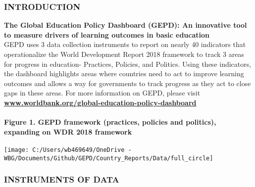 \documentclass[twocolumn]{article}
\author{}
\date{\vspace{-2.5em}}
\let\oldparagraph\paragraph
\renewcommand{\paragraph}[1]{\oldparagraph{#1}\mbox{}}
\begin{document}
\newcommand{\greynote}[1]{
    {\scriptsize
    \textcolor{darkgray}{\textit{Source:} #1}
  }
}

\newcommand{\greysource}[1]{
    {\scriptsize
    \textcolor{darkgray}{\textit{Source:} #1}
  }
}

\newcommand{\greydisclaimer}[1]{
    {\scriptsize
    \textcolor{darkgray}{\textit{Disclaimer:} #1}
  }
}

\newcommand*{\tabindent}{\hspace{1mm}}

\hypertarget{introduction}{%
\subsubsection{\texorpdfstring{\textbf{INTRODUCTION}}{INTRODUCTION}}\label{introduction}}

\textbf{The Global Education Policy Dashboard (GEPD): An innovative tool
to measure drivers of learning outcomes in basic education}\\
GEPD uses 3 data collection instruments to report on nearly 40
indicators that operationalize the World Development Report 2018
framework to track 3 areas for progress in education- Practices,
Policies, and Politics. Using these indicators, the dashboard highlights
areas where countries need to act to improve learning outcomes and
allows a way for governments to track progress as they act to close gaps
in these areas. For more information on GEPD, please visit
\textbf{\href{https://www.worldbank.org/en/topic/education/brief/global-education-policy-dashboard}{www.worldbank.org/global-education-policy-dashboard}}

\hypertarget{figure-1.-gepd-framework-practices-policies-and-politics-expanding-on-wdr-2018-framework}{%
\paragraph{Figure 1. GEPD framework (practices, policies and politics),
expanding on WDR 2018
framework}\label{figure-1.-gepd-framework-practices-policies-and-politics-expanding-on-wdr-2018-framework}}

\begin{center}\texttt{[image: C:/Users/wb469649/OneDrive - WBG/Documents/Github/GEPD/Country\_Reports/Data/full\_circle]} \end{center}

\hypertarget{instruments-of-data}{%
\subsubsection{\texorpdfstring{\textbf{INSTRUMENTS OF
DATA}}{INSTRUMENTS OF DATA}}\label{instruments-of-data}}
\end{document}
